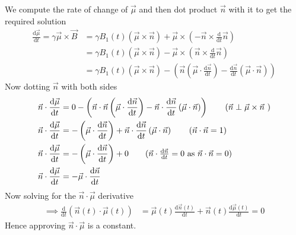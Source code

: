\documentclass[letter, 10pts]{article}
\begin{document}
We compute the rate of change of $\vec{\mu}$ and then dot product $\vec{n}$ with it to get the required solution
\begin{align*}
\frac{\mathrm{d} \vec{\mu}}{\mathrm{d} t} = \gamma \vec{\mu} \times  \vec{B} &= 
\gamma B_1(t) (\vec{\mu} \times \vec{n}) +
\vec{\mu} \times  
\left(- \vec{n} \times  \frac{\mathrm{d} }{\mathrm{d} t} \vec{n}\right)
\\ 
&= 
\gamma B_1(t) (\vec{\mu} \times \vec{n}) -
\vec{\mu} \times  
\left( \vec{n} \times  \frac{\mathrm{d} }{\mathrm{d} t} \vec{n}\right)
\\ 
&= 
\gamma B_1(t) (\vec{\mu} \times \vec{n}) 
- 
\left(
\vec{n} 
\left(\vec{\mu} \cdot  \frac{\mathrm{d}\vec{n} }{\mathrm{d} t} \right)
- 
\frac{\mathrm{d}\vec{n} }{\mathrm{d} t} 
\left(
	\vec{\mu} \cdot \vec{n}
\right)
\right)
\end{align*}
Now dotting $\vec{n}$ with both sides 
\begin{align*}
\vec{n} \cdot  
\frac{\mathrm{d} \vec{\mu}}{\mathrm{d} t} &= 
0 - 
\left(
\vec{n} \cdot  \vec{n} 
\left(\vec{\mu} \cdot  \frac{\mathrm{d} \vec{n}}{\mathrm{d} t}\right)
- 
\vec{n} \cdot  \frac{\mathrm{d} \vec{n}}{\mathrm{d} t} \left(\vec{\mu} \cdot  \vec{n}\right)
\right) 
\tag{$\vec{n} \perp \vec{\mu} \times  \vec{n} $ } 
\\ 
\vec{n} \cdot  
\frac{\mathrm{d} \vec{\mu}}{\mathrm{d} t} &= 
 - 
\left(\vec{\mu} \cdot  \frac{\mathrm{d} \vec{n}}{\mathrm{d} t}\right)
+ 
\vec{n} \cdot  \frac{\mathrm{d} \vec{n}}{\mathrm{d} t} \left(\vec{\mu} \cdot  \vec{n}\right) 
\tag{$\vec{n} \cdot  \vec{n} = 1$}
\\ 
\vec{n} \cdot  
\frac{\mathrm{d} \vec{\mu}}{\mathrm{d} t} &= 
 - 
\left(\vec{\mu} \cdot  \frac{\mathrm{d} \vec{n}}{\mathrm{d} t}\right)
+0   
\tag{$\vec{n} \cdot \frac{\mathrm{d} \vec{n}}{\mathrm{d} t} = 0$ as $\vec{n} \cdot  \vec{n} = 0$}
\\ 
\vec{n} \cdot  
\frac{\mathrm{d} \vec{\mu}}{\mathrm{d} t} &= 
 - 
\vec{\mu} \cdot  \frac{\mathrm{d} \vec{n}}{\mathrm{d} t}
\end{align*} 
Now solving for the $\vec{n} \cdot \vec{\mu}$ derivative 
\begin{align*} 
	\implies 
\frac{\mathrm{d} }{\mathrm{d} t} \left(
\vec{n}(t) \cdot  \vec{\mu}(t) 
	\right) &= 
\vec{\mu}(t) \frac{\mathrm{d} \vec{n}(t)}{\mathrm{d} t} + 
\vec{n}(t) \frac{\mathrm{d} \vec{\mu}(t)}{\mathrm{d} t} = 0
\end{align*}
Hence approving $\vec{n} \cdot \vec{\mu}$ is a constant. 
\end{document}
